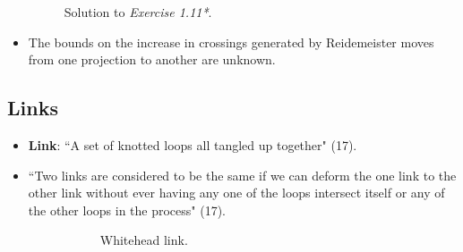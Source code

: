 \documentclass[titlepage]{article}
\numberwithin{figure}{section}
\numberwithin{table}{section}
\numberwithin{equation}{section}
\newcommand{\dq}[2]{``#1" (#2).}
\begin{document}
\begin{itemize}
\begin{figure}[h!]
        \caption{Solution to \emph{Exercise 1.11*}.}
        \label{fig:ex1-11-2}
    \end{figure}
    \item The bounds on the increase in crossings generated by Reidemeister moves from one projection to another are unknown.
\end{itemize}


\subsection{Links}\label{sss:Links}
\begin{itemize}
    \item \textbf{Link}: \dq{A set of knotted loops all tangled up together}{17}
    \item \dq{Two links are considered to be the same if we can deform the one link to the other link without ever having any one of the loops intersect itself or any of the other loops in the process}{17}
    \begin{figure}[h!]
        \centering
        \begin{subfigure}[b]{0.2\linewidth}
            \centering
            \caption{Whitehead link.}
            \label{fig:WhiteheadBorromeana}
        \end{subfigure}
        \begin{subfigure}[b]{0.2\linewidth}
            \centering
\end{subfigure}
\end{figure}
\end{itemize}
\end{document}
